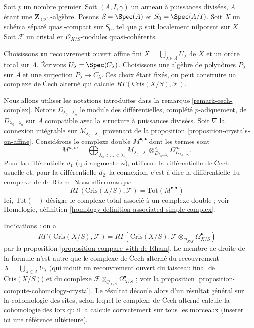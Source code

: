 \begin{remark}
\label{remark-alternating-cech-complex}
Soit $p$ un nombre premier. Soit $(A, I, \gamma)$ un anneau à puissances
divisées, $A$ étant une $\mathbf{Z}_{(p)}$-algèbre. Posons $S = \Spec(A)$ et
$S_0 = \Spec(A/I)$. Soit $X$ un schéma séparé quasi-compact
sur $S_0$, tel que $p$ soit localement nilpotent sur $X$. Soit
$\mathcal{F}$ un cristal en $\mathcal{O}_{X/S}$-modules quasi-cohérents.

\medskip\noindent
Choisissons un recouvrement ouvert affine fini
$X = \bigcup_{\lambda \in \Lambda} U_\lambda$ de $X$
et un ordre total sur $\Lambda$.
Écrivons $U_\lambda = \Spec(C_\lambda)$. Choisissons une algèbre de polynômes
$P_\lambda$ sur $A$ et une surjection $P_\lambda \to C_\lambda$.
Ces choix étant fixés, on peut construire un complexe
de {\v C}ech alterné qui calcule $R\Gamma(\text{Cris}(X/S), \mathcal{F})$.

\medskip\noindent
Nous allons utiliser les notations introduites dans la
remarque \ref{remark-cech-complex}.
Notons $\Omega_{\lambda_0 \ldots \lambda_n}$
le module des différentielles, complété $p$-adiquement, de
$D_{\lambda_0 \ldots \lambda_n}$ sur $A$ compatible avec la structure à puissances
divisées. Soit $\nabla$ la connexion intégrable sur
$M_{\lambda_0 \ldots \lambda_n}$ provenant de la
proposition \ref{proposition-crystals-on-affine}.
Considérons le complexe double $M^{\bullet, \bullet}$ dont les
termes sont
$$
M^{n, m} =
\bigoplus\nolimits_{\lambda_0 < \ldots < \lambda_n}
M_{\lambda_0 \ldots \lambda_n}
\otimes^\wedge_{D_{\lambda_0 \ldots \lambda_n}}
\Omega^m_{D_{\lambda_0 \ldots \lambda_n}}.
$$
Pour la différentielle $d_1$ (qui augmente $n$), utilisons la différentielle
de {\v C}ech usuelle et, pour la différentielle $d_2$,
la connexion, c'est-à-dire la différentielle du complexe de de Rham.
Nous affirmons que
$$
R\Gamma(\text{Cris}(X/S), \mathcal{F}) = \text{Tot}(M^{\bullet, \bullet})
$$
Ici, $\text{Tot}(-)$ désigne le complexe total associé à un
complexe double ; voir
Homologie, définition \ref{homology-definition-associated-simple-complex}.

\medskip\noindent
Indications : on a
$$
R\Gamma(\text{Cris}(X/S), \mathcal{F}) = R\Gamma(\text{Cris}(X/S),
\mathcal{F} \otimes_{\mathcal{O}_{X/S}} \Omega_{X/S}^\bullet)
$$
par la proposition \ref{proposition-compare-with-de-Rham}.
Le membre de droite de la formule n'est autre que le complexe de {\v C}ech alterné
du recouvrement $X = \bigcup_{\lambda \in \Lambda} U_\lambda$
(qui induit un recouvrement ouvert du faisceau final de $\text{Cris}(X/S)$)
et du complexe $\mathcal{F} \otimes_{\mathcal{O}_{X/S}} \Omega_{X/S}^\bullet$ ;
voir la proposition \ref{proposition-compute-cohomology-crystal}.
Le résultat découle alors d'un résultat général sur la cohomologie des sites,
selon lequel le complexe de {\v C}ech alterné calcule la cohomologie
dès lors qu'il la calcule correctement sur tous les morceaux (insérer ici une
référence ultérieure).
\end{remark}

